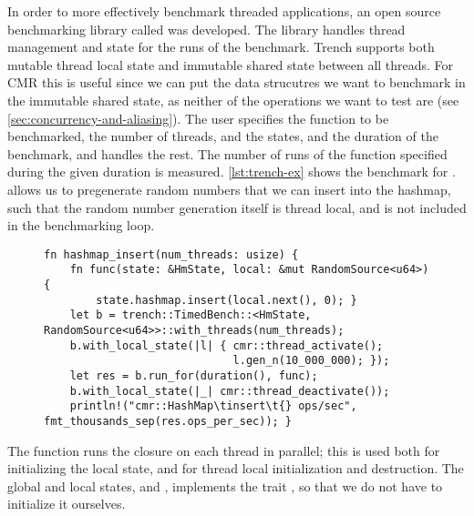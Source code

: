 In order to more effectively benchmark threaded applications, an open source benchmarking library
called \cite{trench} was developed. The library handles thread management and state
for the runs of the benchmark. Trench supports both mutable thread local state and immutable shared
state between all threads. For CMR this is useful since we can put the data strucutres we want to
benchmark in the immutable shared state, as neither of the operations we want to test are
 (see \cref{sec:concurrency-and-aliasing}). The user specifies the function to be
benchmarked, the number of threads, and the states, and the duration of the benchmark, and
 handles the rest. The number of runs of the function specified during the given
duration is measured.  \cref{lst:trench-ex} shows the benchmark for .
 allows us to pregenerate random numbers that we can insert into the hashmap,
such that the random number generation itself is thread local, and is not included in the
benchmarking loop.

\begin{figure}[ht]
\begin{lstlisting}[style=Rust,
label=lst:trench-ex,caption=\code{Hashmap::insert} benchmark using \code{trench}]
fn hashmap_insert(num_threads: usize) {
    fn func(state: &HmState, local: &mut RandomSource<u64>) {
        state.hashmap.insert(local.next(), 0); }
    let b = trench::TimedBench::<HmState, RandomSource<u64>>::with_threads(num_threads);
    b.with_local_state(|l| { cmr::thread_activate();
                             l.gen_n(10_000_000); });
    let res = b.run_for(duration(), func);
    b.with_local_state(|_| cmr::thread_deactivate());
    println!("cmr::HashMap\tinsert\t{} ops/sec", fmt_thousands_sep(res.ops_per_sec)); }
\end{lstlisting}
\end{figure}

The  function runs the closure on each thread in parallel; this is used both
for initializing the local state, and for thread local initialization and destruction.
The global and local states,  and , implements the trait
, so that we do not have to initialize it ourselves.
